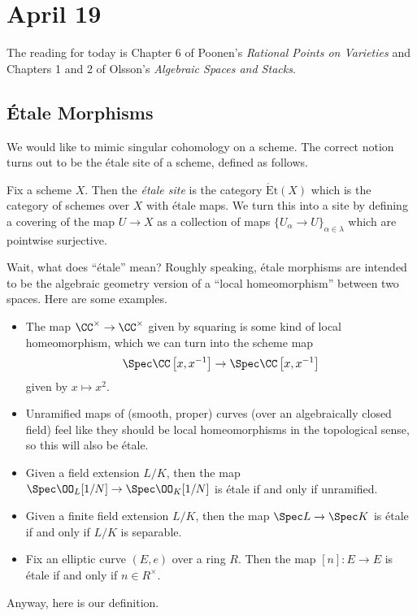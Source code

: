 \documentclass[../notes.tex]{subfiles}
\begin{document}
\section{April 19}

The reading for today is Chapter 6 of Poonen's \textit{Rational Points on Varieties} and Chapters 1 and 2 of Olsson's \textit{Algebraic Spaces and Stacks}.

\subsection{\'Etale Morphisms}
We would like to mimic singular cohomology on a scheme. The correct notion turns out to be the \'etale site of a scheme, defined as follows.
\begin{definition}
	Fix a scheme $X$. Then the \textit{\'etale site} is the category $\mathrm{\acute Et}(X)$ which is the category of schemes over $X$ with \'etale maps. We turn this into a site by defining a covering of the map $U\to X$ as a collection of maps $\{U_\alpha\to U\}_{\alpha\in\lambda}$ which are pointwise surjective.
\end{definition}
Wait, what does ``\'etale'' mean? Roughly speaking, \'etale morphisms are intended to be the algebraic geometry version of a ``local homeomorphism'' between two spaces. Here are some examples.
\begin{itemize}
	\item The map $\CC^\times\to\CC^\times$ given by squaring is some kind of local homeomorphism, which we can turn into the scheme map
	\[\Spec \CC\left[x,x^{-1}\right]\to\Spec \CC\left[x,x^{-1}\right]\]
	given by $x\mapsto x^2$.
	\item Unramified maps of (smooth, proper) curves (over an algebraically closed field) feel like they should be local homeomorphisms in the topological sense, so this will also be \'etale.
	\item Given a field extension $L/K$, then the map $\Spec\OO_L[1/N]\to\Spec\OO_K[1/N]$ is \'etale if and only if unramified.
	\item Given a finite field extension $L/K$, then the map $\Spec L\to\Spec K$ is \'etale if and only if $L/K$ is separable.
	\item Fix an elliptic curve $(E,e)$ over a ring $R$. Then the map $[n]\colon E\to E$ is \'etale if and only if $n\in R^\times$.
\end{itemize}
Anyway, here is our definition.
\end{document}
